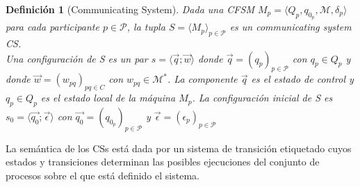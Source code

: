 \documentclass[paper=a4, fontsize=11pt, spanish]{scrartcl} %
\numberwithin{equation}{section} %
\numberwithin{figure}{section} %
\numberwithin{table}{section} %
\newtheorem{definition}{Definición}
\begin{document}
\begin{definition}[Communicating System] Dada una CFSM $\textit{M}_p = \langle Q_p, q_{0_p}, \mathcal{M}, \delta_p \rangle $ para cada participante $p \in \mathcal{P}$, la tupla $S= \langle M_p \rangle_{p \in \mathcal{P}} $ es un communicating system CS.\\

Una configuración de S es un par $s = \langle \overrightarrow{q} ; \overrightarrow{w} \rangle$ donde $\overrightarrow{q} = (q_p)_{p \in \mathcal{P}}$ con $q_p \in Q_p$ y donde $\overrightarrow{w} = (w_{pq})_{pq \in C}$ con $ w_{pq} \in \mathcal{M}^*$. La componente $\overrightarrow{q}$ es el estado de control y $q_p \in Q_p$ es el estado local de la máquina $ M_p$. La configuración inicial de S es $s_0 = \langle \overrightarrow{q_0} ; \overrightarrow{\epsilon} \rangle$ con $\overrightarrow{q_0} = (q_{0_p})_{p \in \mathcal{P}}$ y $\overrightarrow{\epsilon} = (\epsilon_p)_{p \in \mathcal{P}}$

\end{definition}

La semántica de los CSs está dada por un sistema de transición etiquetado \cite{lts} cuyos estados y transiciones determinan las posibles ejecuciones del conjunto de procesos sobre el que está definido el sistema.
\end{document}
